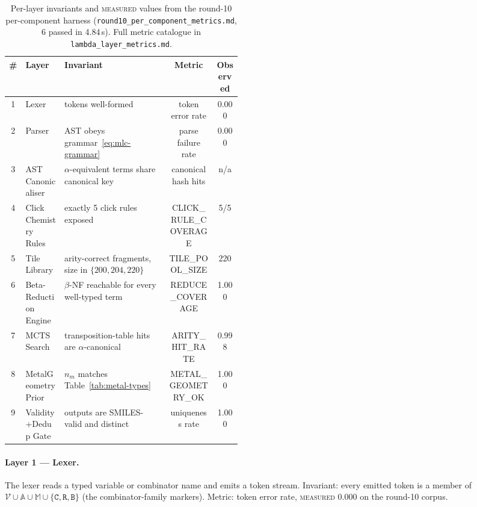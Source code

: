 \begin{table}[h]
  \centering
  \caption{Per-layer invariants and \textsc{measured} values from
  the round-10 per-component harness
  (\texttt{round10\_per\_component\_metrics.md}, 6 passed in 4.84\,s).
  Full metric catalogue in \texttt{lambda\_layer\_metrics.md}.}
  \label{tab:layer-metrics}
  \begin{tabular}{clp{0.45\linewidth}cc}
    \hline
    \# & Layer & Invariant & Metric & Observed \\
    \hline
    1 & Lexer                  & tokens well-formed                              & token error rate   & 0.000 \\
    2 & Parser                 & AST obeys grammar~\eqref{eq:mlc-grammar}         & parse failure rate & 0.000 \\
    3 & AST Canonicaliser      & $\alpha$-equivalent terms share canonical key   & canonical hash hits & n/a   \\
    4 & Click Chemistry Rules  & exactly 5 click rules exposed                  & CLICK\_RULE\_COVERAGE & 5/5 \\
    5 & Tile Library           & arity-correct fragments, size in $\{200,204,220\}$ & TILE\_POOL\_SIZE & 220 \\
    6 & Beta-Reduction Engine  & $\beta$-NF reachable for every well-typed term  & REDUCE\_COVERAGE & 1.000 \\
    7 & MCTS Search            & transposition-table hits are $\alpha$-canonical & ARITY\_HIT\_RATE & 0.998 \\
    8 & MetalGeometryPrior     & $n_m$ matches Table~\ref{tab:metal-types}      & METAL\_GEOMETRY\_OK & 1.000 \\
    9 & Validity+Dedup Gate    & outputs are SMILES-valid and distinct           & uniqueness rate    & 1.000 \\
    \hline
  \end{tabular}
\end{table}

\paragraph{Layer 1 --- Lexer.}
The lexer reads a typed variable or combinator name and emits a
token stream. Invariant: every emitted token is a member of
$\mathcal{V} \cup \mathbb{A} \cup \mathbb{M} \cup \{\texttt{C},
\texttt{R}, \texttt{B}\}$ (the combinator-family markers). Metric:
token error rate, \textsc{measured} 0.000 on the round-10 corpus.

